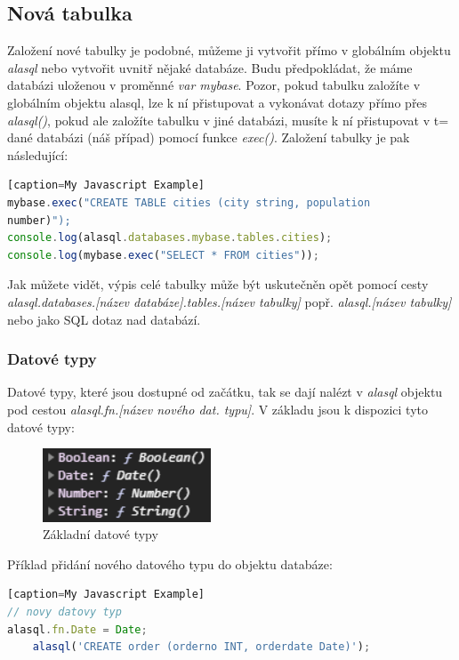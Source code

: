 \documentclass[a4, titlepage]{article}
\begin{document}
\subsection{Nová tabulka}
Založení nové tabulky je podobné, můžeme ji vytvořit přímo v globálním objektu \textit{alasql} nebo vytvořit uvnitř nějaké databáze. Budu předpokládat, že máme databázi uloženou v proměnné \textit{var mybase}. Pozor, pokud tabulku založíte v globálním objektu alasql, lze k ní přistupovat a vykonávat dotazy přímo přes \textit{alasql()}, pokud ale založíte tabulku v jiné databázi, musíte k ní přistupovat v t= dané databázi (náš případ) pomocí funkce \textit{exec()}. Založení tabulky je pak následující:

\begin{lstlisting}[language=JavaScript][caption=My Javascript Example]
mybase.exec("CREATE TABLE cities (city string, population 
number)");
console.log(alasql.databases.mybase.tables.cities);
console.log(mybase.exec("SELECT * FROM cities"));
\end{lstlisting}

Jak můžete vidět, výpis celé tabulky může být uskutečněn opět pomocí cesty \textit{alasql.databases.[název databáze].tables.[název tabulky]} popř. \textit{alasql.[název tabulky]} nebo jako SQL dotaz nad databází.

\subsubsection{Datové typy}
Datové typy, které jsou dostupné od začátku, tak se dají nalézt v \textit{alasql} objektu pod cestou \textit{alasql.fn.[název nového dat. typu]}. V základu jsou k dispozici tyto datové typy:
\begin{figure}[h]
    \centering
    \includegraphics[width=5cm]{fn}
    \caption{Základní datové typy}
\end{figure}

Příklad přidání nového datového typu do objektu databáze:
\begin{lstlisting}[language=JavaScript][caption=My Javascript Example]
// novy datovy typ
alasql.fn.Date = Date;
    alasql('CREATE order (orderno INT, orderdate Date)');
\end{lstlisting}
\end{document}
